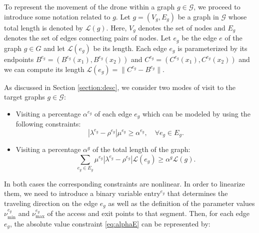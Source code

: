 \noindent
To represent the movement of the drone within a graph $g\in\mathcal G$, we proceed to introduce some notation related to $g$.
Let $g = (V_g, E_g)$ be a graph in $\mathcal G$ whose total length is denoted by $\mathcal L(g)$. Here, $V_g$ denotes the set of nodes and $E_g$ denotes the set of edges connecting pairs of nodes. Let $e_g$ be the edge $e$ of the graph $g \in G$ and let $\mathcal  L(e_g)$ be its length. Each edge $e_g$ is parameterized by its endpoints $B^{e_g}= (B^{e_g}(x_1), B^{e_g}(x_2))$ and $C^{e_g}= (C^{e_g}(x_1), C^{e_g}(x_2))$ and we can compute its length $\mathcal L(e_g) =\|C^{e_g} -  B^{e_g}\|$.

\noindent
As discussed in Section \ref{section:desc}, we consider two modes of visit to the target graphs $g\in \mathcal{G}$:
\begin{itemize}
    \item Visiting a percentage $\alpha^{e_g}$ of each edge $e_g$ which can be modeled by using the following constraints:
    \begin{equation}\label{eq:alphaE}\tag{$\alpha$-E}
    |\lambda^{e_g} - \rho^{e_g}|\mu^{e_g}\geq \alpha^{e_g}, \quad \forall e_g\in E_g.
    \end{equation}
    \item Visiting a percentage $\alpha^g$ of the total length of the graph:
    \begin{equation}\label{eq:alphaG}\tag{$\alpha$-G}
    \sum_{e_g\in E_g} \mu^{e_g}|\lambda^{e_g} - \rho^{e_g}|\mathcal L(e_g) \geq \alpha^g\mathcal L(g).
    \end{equation}
\end{itemize}

\bigskip
\noindent
In both cases the corresponding constraints are nonlinear. In order to linearize them, we need to introduce a binary variable $\text{entry}^{e_g}$ that determines the traveling direction on the edge $e_g$ as well as the definition of the parameter values $\nu_\text{min}^{e_g}$ and $\nu_\text{max}^{e_g}$ of the access and exit points to that segment. Then, for each edge $e_g$, the absolute value constraint \eqref{eq:alphaE} can be represented by:

